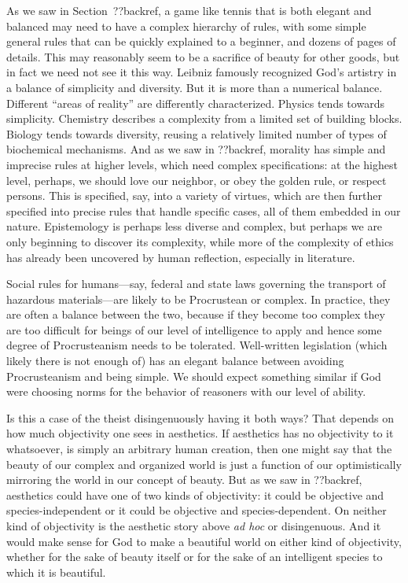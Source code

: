 As we saw in Section~??backref, a game like tennis that is both elegant and balanced may need 
to have a complex hierarchy of rules, with some simple general rules that can be quickly explained to a beginner, and 
dozens of pages of details. This may reasonably seem to be a sacrifice of beauty for other goods, but in fact we need not see it this way. Leibniz famously recognized God's artistry in a balance of simplicity and diversity. But it is more than a numerical balance. Different ``areas of reality'' are differently characterized. Physics tends towards simplicity. Chemistry describes a complexity from 
a limited set of building blocks. Biology tends towards diversity, reusing a relatively limited number of types of biochemical 
mechanisms. And as we saw in ??backref, morality has simple and imprecise rules at higher levels, which need complex 
specifications: at the highest level, perhaps, we should love our neighbor, or obey the golden rule, or respect persons. This 
is specified, say, into a variety of virtues, which are then further specified into precise rules that handle specific cases,
all of them embedded in our nature. Epistemology is perhaps less diverse and complex, but perhaps we are only beginning to 
discover its complexity, while more of the complexity of ethics has already been uncovered by human reflection, especially in literature. 

Social rules for humans---say, federal and state laws governing the transport of hazardous materials---are likely to be
Procrustean or complex. In practice, they are often a balance between the two, because if they become too complex
they are too difficult for beings of our level of intelligence to apply and hence some degree of Procrusteanism 
needs to be tolerated. Well-written legislation (which likely there is not enough of) has an elegant balance between
avoiding Procrusteanism and being simple. We should expect something similar if God were choosing norms for the
behavior of reasoners with our level of ability.

Is this a case of the theist disingenuously having it both ways? That depends on how much objectivity one sees in aesthetics.
If aesthetics has no objectivity to it whatsoever, is simply an arbitrary human creation, then one might say that the beauty 
of our complex and organized world is just a function of our optimistically mirroring the world in our concept of beauty.
But as we saw in ??backref, aesthetics could have one of two kinds of objectivity: it could be objective and species-independent or it could be 
objective and species-dependent. On neither kind of objectivity is the aesthetic story above \textit{ad hoc} or disingenuous.
And it would make sense for God to make a beautiful world on either kind of objectivity, whether for the sake of beauty itself
or for the sake of an intelligent species to which it is beautiful. 

